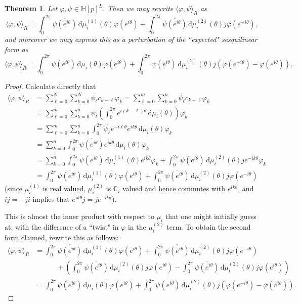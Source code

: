\documentclass[11pt,reqno]{amsart}
\def\p{\varphi}
\def\q{\psi}
\def\th{\theta}
\def\rmd{\mathrm{d}}
\def\CC{\mathbb{C}}
\def\HH{\mathbb{H}}
\newtheorem{theorem}{Theorem}[section]
\theoremstyle{definition}
\numberwithin{equation}{section}
\begin{document}
\begin{theorem}
\label{thm:R-IP}
	Let \(\p, \q \in \HH[p]^L\). Then we may rewrite \( \langle \p, \q \rangle_R\) as
	\[
		\langle \p, \q \rangle_R = \int_0^{2\pi} \overline{\q(e^{i\th})} \, \rmd\mu_i^{(1)}(\th) \p(e^{i\th}) + \int_0^{2\pi} \overline{\q(e^{i\th})} \, \rmd\mu_i^{(2)}(\th) j \p(e^{-i\th}),
	\]
	and moreover we may express this as a perturbation of the ``expected" sesquilinear form as
	\[
		\langle \p, \q \rangle_R = \int_0^{2\pi} \overline{\q(e^{i\th})} \, \rmd\mu_i(\th) \p(e^{i\th}) + \int_0^{2\pi} \overline{\q(e^{i\th})} \, \rmd \mu_i^{(2)}(\th) j \left(\p(e^{-i\th}) - \p(e^{i\th}) \right).
	\]
\end{theorem}
\begin{proof}
	Calculate directly that
	\begin{align*}
	    \langle \p, \q \rangle_R & = \sum_{\ell = 0}^N \sum_{k = 0}^N \overline{\q_\ell} c_{k-\ell} \p_k = \sum_{\ell = 0}^m \sum_{k = 0}^n \overline{\q_\ell} c_{k-\ell} \p_k  \\
	    & = \sum_{\ell = 0}^m \sum_{k = 0}^n \overline{\q_\ell} \left(\int_0^{2\pi} e^{i(k-\ell)\th} \, \rmd \mu_i(\th) \right) \p_k \\
	    & = \sum_{\ell=0}^m \sum_{k=0}^n \int_0^{2\pi} \overline{\q_\ell} e^{-i\ell\th} e^{ik\th} \, \rmd \mu_i(\th) \p_k \\
	    & = \sum_{k=0}^n \int_0^{2\pi} \overline{\q(e^{i\th})} e^{ik\th} \, \rmd \mu_i(\th) \p_k \\
	    & = \sum_{k=0}^n \int_0^{2\pi} \overline{\q(e^{i\th})} \, \rmd\mu_i^{(1)}(\th) e^{ik\th} \p_k + \int_0^{2\pi} \overline{\q(e^{i\th})} \, \rmd\mu_i^{(2)}(\th)j e^{-ik\th} \p_k \\
	    & = \int_0^{2\pi} \overline{\q(e^{i\th})} \, \rmd\mu_i^{(1)}(\th) \p(e^{i\th}) + \int_0^{2\pi} \overline{\q(e^{i\th})} \, \rmd\mu_i^{(2)}(\th) j \p(e^{-i\th})
	\end{align*}
	(since \(\mu_i^{(1)}\) is real valued, \(\mu_i^{(2)}\) is \(\CC_i\) valued and hence commutes with \(e^{ik\th}\), and \(ij = -ji\) implies that \(e^{ik\th} j = j e^{-ik\th}\)).
	
	This is almost the inner product with respect to \(\mu_i\) that one might initially guess at, with the difference of a ``twist" in \(\p\) in the \(\mu_i^{(2)}\) term. To obtain the second form claimed, rewrite this as follows:
	\begin{align*}
	    \langle \p, \q \rangle_R & = \int_0^{2\pi} \overline{\q(e^{i\th})} \, \rmd\mu_i^{(1)}(\th) \p(e^{i\th}) + \int_0^{2\pi} \overline{\q(e^{i\th})} \, \rmd\mu_i^{(2)}(\th) j \p(e^{-i\th}) \\ 
	    & \quad \quad \quad + \left(\int_0^{2\pi} \overline{\q(e^{i\th})} \, \rmd\mu_i^{(2)}(\th) j \p(e^{i\th}) - \int_0^{2\pi} \overline{\q(e^{i\th})} \, \rmd\mu_i^{(2)}(\th) j \p(e^{i\th})\right) \\
	    & = \int_0^{2\pi} \overline{\q(e^{i\th})} \, \rmd\mu_i(\th) \p(e^{i\th}) + \int_0^{2\pi} \overline{\q(e^{i\th})} \, \rmd \mu_i^{(2)}(\th) j \left(\p(e^{-i\th}) - \p(e^{i\th}) \right).
	\end{align*}
\end{proof}
\end{document}
